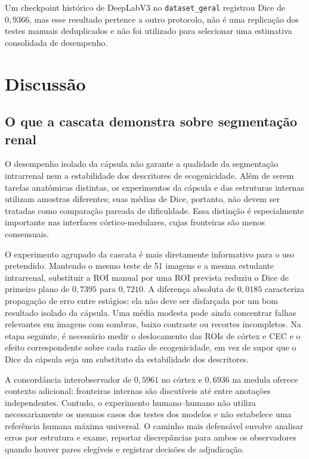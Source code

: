 \documentclass[12pt]{article}
\begin{document}
Um checkpoint histórico de DeepLabV3 no \texttt{dataset\_geral} registrou Dice de $0{,}9366$, mas esse resultado pertence a outro protocolo, não é uma replicação dos testes manuais deduplicados e não foi utilizado para selecionar uma estimativa consolidada de desempenho.

\section{Discussão}

\subsection{O que a cascata demonstra sobre segmentação renal}
O desempenho isolado da cápsula não garante a qualidade da segmentação intrarrenal nem a estabilidade dos descritores de ecogenicidade. Além de serem tarefas anatômicas distintas, os experimentos da cápsula e das estruturas internas utilizam amostras diferentes; suas médias de Dice, portanto, não devem ser tratadas como comparação pareada de dificuldade. Essa distinção é especialmente importante nas interfaces córtico-medulares, cujas fronteiras são menos consensuais.

O experimento agrupado da cascata é mais diretamente informativo para o uso pretendido. Mantendo o mesmo teste de 51 imagens e a mesma estudante intrarrenal, substituir a ROI manual por uma ROI prevista reduziu o Dice de primeiro plano de $0{,}7395$ para $0{,}7210$. A diferença absoluta de $0{,}0185$ caracteriza propagação de erro entre estágios; ela não deve ser disfarçada por um bom resultado isolado da cápsula. Uma média modesta pode ainda concentrar falhas relevantes em imagens com sombras, baixo contraste ou recortes incompletos. Na etapa seguinte, é necessário medir o deslocamento das ROIs de córtex e CEC e o efeito correspondente sobre cada razão de ecogenicidade, em vez de supor que o Dice da cápsula seja um substituto da estabilidade dos descritores.

A concordância interobservador de $0{,}5961$ no córtex e $0{,}6936$ na medula oferece contexto adicional: fronteiras internas são discutíveis até entre anotações independentes. Contudo, o experimento humano--humano não utiliza necessariamente os mesmos casos dos testes dos modelos e não estabelece uma referência humana máxima universal. O caminho mais defensável envolve analisar erros por estrutura e exame, reportar discrepâncias para ambos os observadores quando houver pares elegíveis e registrar decisões de adjudicação.
\end{document}
